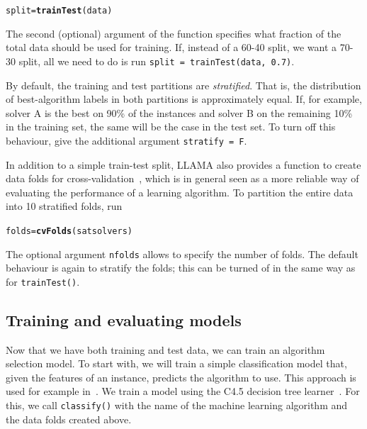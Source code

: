 \documentclass{article}\usepackage[]{graphicx}\usepackage[]{color}
\makeatletter
\newcommand{\hlstd}[1]{\textcolor[rgb]{0.345,0.345,0.345}{#1}}%
\newcommand{\hlkwb}[1]{\textcolor[rgb]{0.69,0.353,0.396}{#1}}%
\newcommand{\hlkwd}[1]{\textcolor[rgb]{0.737,0.353,0.396}{\textbf{#1}}}%
\newenvironment{kframe}{%
 \def\at@end@of@kframe{}%
 \ifinner\ifhmode%
  \def\at@end@of@kframe{\end{minipage}}%
  \begin{minipage}{\columnwidth}%
 \fi\fi%
 \def\FrameCommand##1{\hskip\@totalleftmargin \hskip-\fboxsep
 \colorbox{shadecolor}{##1}\hskip-\fboxsep
     \hskip-\linewidth \hskip-\@totalleftmargin \hskip\columnwidth}%
 \MakeFramed {\advance\hsize-\width
   \@totalleftmargin\z@ \linewidth\hsize
   \@setminipage}}%
 {\par\unskip\endMakeFramed%
 \at@end@of@kframe}
\newenvironment{knitrout}{}{} %
\makeatother
\begin{document}
\begin{knitrout}
\color{fgcolor}\begin{kframe}
\begin{alltt}
\hlstd{split} \hlkwb{=} \hlkwd{trainTest}\hlstd{(data)}
\end{alltt}
\end{kframe}
\end{knitrout}

The second (optional) argument of the function specifies what fraction of the
total data should be used for training. If, instead of a 60-40 split, we want a
70-30 split, all we need to do is run \lstinline{split = trainTest(data, 0.7)}.

By default, the training and test partitions are \emph{stratified}. That is, the
distribution of best-algorithm labels in both partitions is approximately equal.
If, for example, solver A is the best on 90\% of the instances and solver B on
the remaining 10\% in the training set, the same will be the case in the test
set. To turn off this behaviour, give the additional argument
\lstinline{stratify = F}.

In addition to a simple train-test split, LLAMA also provides a function to
create data folds for cross-validation~\cite{kohavi_study_1995}, which is in
general seen as a more reliable way of evaluating the performance of a learning
algorithm. To partition the entire data into 10 stratified folds, run

\begin{knitrout}
\color{fgcolor}\begin{kframe}
\begin{alltt}
\hlstd{folds} \hlkwb{=} \hlkwd{cvFolds}\hlstd{(satsolvers)}
\end{alltt}
\end{kframe}
\end{knitrout}

The optional argument \lstinline{nfolds} allows to specify the number of folds.
The default behaviour is again to stratify the folds; this can be turned of in
the same way as for \lstinline{trainTest()}.

\subsection{Training and evaluating models}

Now that we have both training and test data, we can train an algorithm
selection model. To start with, we will train a simple classification model
that, given the features of an instance, predicts the algorithm to use. This
approach is used for example in~\cite{gent_learning_2010}. We train a model
using the C4.5 decision tree learner~\cite{quinlan_c4.5_1993}.
For this, we call \lstinline{classify()} with the name of the machine learning
algorithm and the data folds created above.
\end{document}
